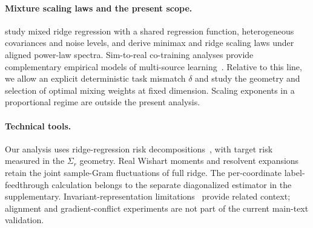 \paragraph{Mixture scaling laws and the present scope.}
\cite{wu2026mixture} study mixed ridge regression with a shared regression function, heterogeneous covariances and noise levels, and derive minimax and ridge scaling laws under aligned power-law spectra. Sim-to-real co-training analyses provide complementary empirical models of multi-source learning~\cite{lei2026simreal}.
Relative to this line, we allow an explicit deterministic task mismatch $\delta$ and study the geometry and selection of optimal mixing weights at fixed dimension. Scaling exponents in a proportional regime are outside the present analysis.

\paragraph{Technical tools.}
Our analysis uses ridge-regression risk decompositions~\cite{dobriban2018high,hastie2022surprises}, with target risk measured in the $\Sigma_r$ geometry. Real Wishart moments and resolvent expansions retain the joint sample-Gram fluctuations of full ridge. The per-coordinate label-feedthrough calculation belongs to the separate diagonalized estimator in the supplementary. Invariant-representation limitations~\cite{zhao2019learning,arjovsky2019invariant} provide related context; alignment and gradient-conflict experiments are not part of the current main-text validation.

